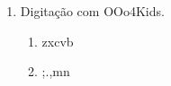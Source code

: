 \begin{enumerate}
	\item Digitação com OOo4Kids.
	\begin{enumerate}
		\item zxcvb
		\item ;.,mn
	\end{enumerate}
\end{enumerate}

